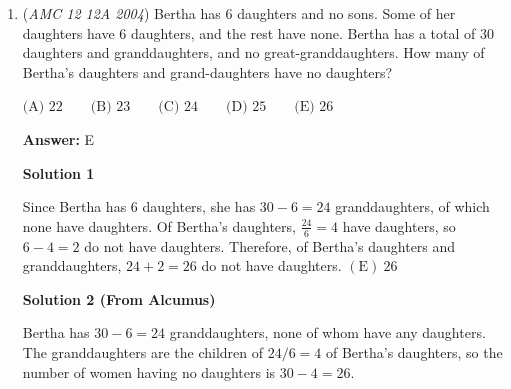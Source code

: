 \begin{enumerate}
 \textbf{Answer: }B



\textbf{Solution 1}

Every integer value of $y$ leads to an integer solution for $x$Since $y$ must be positive, $y\geq 1$

 Also, $y = \frac{100-x}{2}$Since $x$ must be positive, $y < 50$
$1 \leq y < 50$This leaves $49$ values for y, which mean there are $49$ solutions to the equation $\Rightarrow \mathrm{(B)}$




\textbf{Solution 2}

If $x$ and $2y$ must each be positive integers, then we can say that $x$ is at least 1 and $2y$ is at least 1. From there, we want to find out how many ways there are to distribute the other 98 ones (the smallest positive integer addends of 100). 98 identical objects can be distributed to two distinct bins in 99 ways (think stars and bars), yet this 99 is an overcount. Because $y$ must be an integer, $2y$ must be even; thus only $\left\lfloor \frac{99}{2} \right\rfloor = \boxed{ 49 \implies B}$ ways exist to distribute these ones.

 


	\item (\textit{AMC 12 12A 2004}) Bertha has $6$ daughters and no sons. Some of her daughters have $6$ daughters, and the rest have none. Bertha has a total of $30$ daughters and granddaughters, and no great-granddaughters. How many of Bertha's daughters and grand-daughters have no daughters? 


 $\text{(A) } 22 \qquad \text{(B) } 23 \qquad \text{(C) } 24 \qquad \text{(D) } 25 \qquad \text{(E) } 26$

 \textbf{Answer: }E



\textbf{Solution 1}

Since Bertha has $6$ daughters, she has $30-6=24$ granddaughters, of which none have daughters.  Of Bertha's daughters, $\frac{24}6=4$ have daughters, so $6-4=2$ do not have daughters. Therefore, of Bertha's daughters and granddaughters, $24+2=26$ do not have daughters.  $\boxed{\mathrm{(E)}\ 26}$




\textbf{Solution 2 (From Alcumus)}

Bertha has $30 - 6 = 24$ granddaughters, none of whom have any daughters. The granddaughters are the children of $24/6 = 4$ of Bertha's daughters, so the number of women having no daughters is $30 - 4 = \boxed{26}$.


\end{enumerate}
